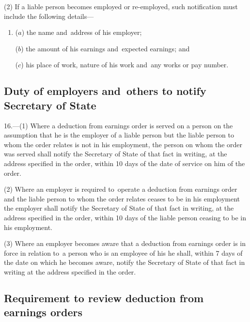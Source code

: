 \documentclass[12pt,a4paper]{article}
\begin{document}
(2) If a liable person becomes employed or re-employed, such notification must include the following details—
\begin{enumerate}\item[]
($a$) the name and~address of his employer;

($b$) the amount of his earnings and~expected earnings; and

($c$) his place of work, nature of his work and~any works or pay number.
\end{enumerate}



\subsection[16. Duty of employers and~others to notify Secretary of State]{Duty of employers and~others to notify Secretary of State}

16.—(1) Where a deduction from earnings order is served on a person on the assumption that he is the employer of a liable person but the liable person to whom the order relates is not in his employment, the person on whom the order was served shall notify the Secretary of State of that fact in writing, at the address specified in the order, within 10 days of the date of service on him of the order.

(2) Where an employer is required to~operate a deduction from earnings order and the liable person to whom the order relates ceases to be in his employment the employer shall notify the Secretary of State of that fact in writing, at the address specified in the order, within 10 days of the liable person ceasing to be in his employment.

(3) Where an employer becomes aware that a deduction from earnings order is in force in relation to~a person who is an employee of his he shall, within 7 days of the date on which he becomes aware, notify the Secretary of State of that fact in writing at the address specified in the order.

\subsection[17. Requirement to review deduction from earnings orders]{Requirement to review deduction from earnings orders}

%
\end{document}
